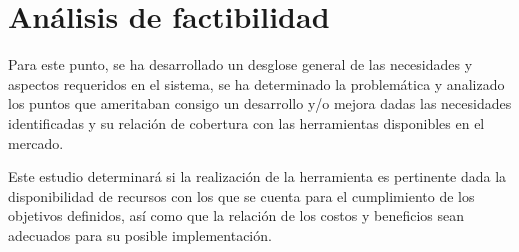 \section{Análisis de factibilidad}
Para este punto, se ha desarrollado un desglose general de las necesidades y aspectos requeridos en el sistema, se ha determinado la problemática y analizado los puntos que ameritaban consigo un desarrollo y/o mejora dadas las necesidades identificadas y su relación de cobertura con las herramientas disponibles en el mercado.


Este estudio determinará si la realización de la  herramienta es pertinente dada la disponibilidad de recursos con los que se cuenta para el cumplimiento de los objetivos definidos, así como que la relación de los costos y beneficios sean adecuados para su posible implementación.
